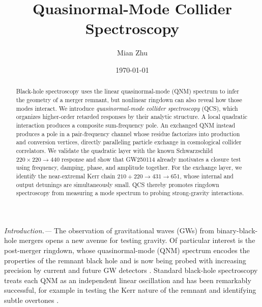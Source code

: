 \documentclass[
 reprint,
 amsmath,amssymb,
 aps,
 prl,
 superscriptaddress,
 nofootinbib
]{revtex4-2}
\begin{document}
\title{Quasinormal-Mode Collider Spectroscopy}

\author{Mian Zhu}

\date{\today}

\begin{abstract}
Black-hole spectroscopy uses the linear quasinormal-mode (QNM) spectrum to infer the geometry of a merger remnant, but nonlinear ringdown can also reveal how those modes interact. We introduce \emph{quasinormal-mode collider spectroscopy} (QCS), which organizes higher-order retarded responses by their analytic structure. A local quadratic interaction produces a composite sum-frequency pole. An exchanged QNM instead produces a pole in a pair-frequency channel whose residue factorizes into production and conversion vertices, directly paralleling particle exchange in cosmological collider correlators. We
validate the quadratic layer with the known Schwarzschild $220\times220\rightarrow440$ response and show that GW250114 already motivates a closure test using frequency, damping, phase, and amplitude together. For the exchange layer, we identify the near-extremal Kerr chain $210+220\rightarrow431\rightarrow651$, whose internal and output detunings are simultaneously small. QCS thereby promotes ringdown spectroscopy from measuring a mode spectrum to probing strong-gravity interactions.
\end{abstract}

\maketitle

\textit{Introduction.---}
The observation of gravitational waves (GWs) from binary-black-hole mergers opens a new avenue for testing gravity. Of particular interest is the post-merger ringdown, whose quasinormal-mode (QNM) spectrum encodes the properties of the remnant black hole \cite{Berti2009Quasinormal,London2014ModelingRingdown,Cardoso2016EventHorizon,Bhagwat2020Subdominant} and is now being probed with increasing precision by current and future GW detectors
\cite{LIGO2016Observation,LIGO2021GWTC2,LVK2023GWTC3,LVK2025GW250114,Punturo2010EinsteinTelescope,Luo2016TianQin,Hu2017Taiji,AmaroSeoane2017LISA,Reitze2019CosmicExplorer}. Standard black-hole spectroscopy treats each QNM as an independent linear oscillation and has been remarkably successful, for example in testing the Kerr nature of the remnant \cite{Isi2019NoHair} and identifying subtle overtones \cite{Giesler2019Overtones}.
\end{document}
